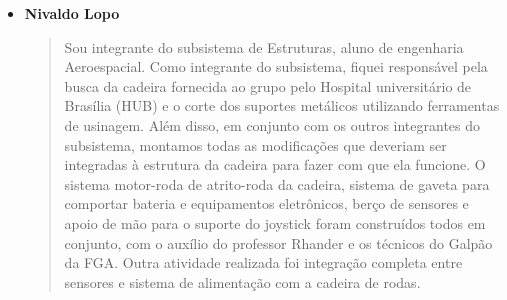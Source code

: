 \begin{itemize}
    \item \textbf{Nivaldo Lopo}
    \begin{quote}
        Sou integrante do subsistema de Estruturas, aluno de engenharia Aeroespacial. Como integrante do subsistema, fiquei responsável pela busca da cadeira fornecida ao grupo pelo Hospital universitário de Brasília (HUB) e o corte dos suportes metálicos utilizando ferramentas de usinagem. Além disso, em conjunto com os outros integrantes do subsistema, montamos todas as modificações que deveriam ser integradas à estrutura da cadeira para fazer com que ela funcione. O sistema motor-roda de atrito-roda da cadeira, sistema de gaveta para comportar bateria e equipamentos eletrônicos, berço de sensores e apoio de mão para o suporte do joystick foram construídos todos em conjunto, com o auxílio do professor Rhander e os técnicos do Galpão da FGA. Outra atividade realizada foi integração completa entre sensores e sistema de alimentação com a cadeira de rodas.
    \end{quote}
\end{itemize}
